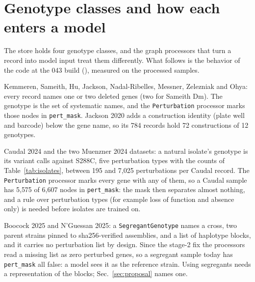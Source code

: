 
\section{Genotype classes and how each enters a model}
\label{sec:genotypes}

The store holds four genotype classes, and the graph processors that turn a record into
model input treat them differently. What follows is the behavior of the code at the 043
build (), measured on the processed samples.

Kemmeren, Sameith, Hu, Jackson, Nadal-Ribelles, Messner, Zelezniak and Ohya: every
record names one or two deleted genes (two for Sameith Dm). The genotype is the set of
systematic names, and the \texttt{Perturbation} processor marks those nodes in
\texttt{pert\_mask}. Jackson 2020 adds a construction identity (plate well and
barcode) below the gene name, so its 784 records hold 72 constructions of 12
genotypes.

Caudal 2024 and the two Muenzner 2024 datasets: a natural isolate's genotype is its
variant calls against S288C, five perturbation types with the counts of
Table~\ref{tab:isolates}, between 195 and 7{,}025 perturbations per Caudal record.
The \texttt{Perturbation} processor marks every gene with any of them, so a Caudal
sample has 5{,}575 of 6{,}607 nodes in \texttt{pert\_mask}: the mask then separates
almost nothing, and a rule over perturbation types (for example loss of function and
absence only) is needed before isolates are trained on.

\begin{table}[htbp]
\centering
\scriptsize
\setlength{\tabcolsep}{3pt}
\caption[]{\textbf{Perturbations of an isolate record, by type.} Mean count per record
over the records of each dataset (). Sequence variants
are named by the gene they fall in; natural loss of function, gene absence and gene
presence are released calls; the few deletions are engineered markers.}
\label{tab:isolates}

\end{table}

Boocock 2025 and N'Guessan 2025: a \texttt{SegregantGenotype} names a cross, two parent
strains pinned to sha256-verified assemblies, and a list of haplotype blocks, and it
carries no perturbation list by design. Since the stage-2 fix the processors read a
missing list as zero perturbed genes, so a segregant sample today has
\texttt{pert\_mask} all false: a model sees it as the reference strain. Using
segregants needs a representation of the blocks; Sec.~\ref{sec:proposal} names one.


